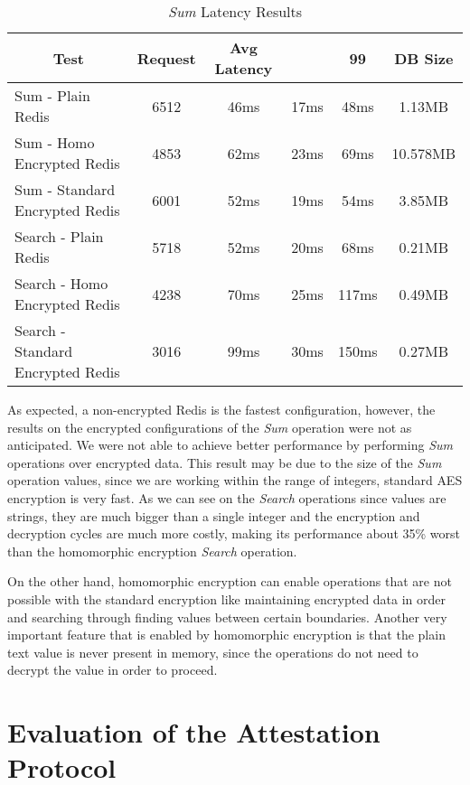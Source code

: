 \begin{table}[ht]
	\caption{\textit{Sum} Latency Results}
	\label{tab:sum_latency_results}
\centering
\hspace*{-5mm}
\begin{tabular}{lccccc}
	\toprule
	\multicolumn{1}{c}{\textbf{Test}} & \pmb{\#}\textbf{Request} & \textbf{Avg Latency} & \pmb{\ensuremath{\sigma}} & \textbf{99}\pmb{\%} & \textbf{DB Size} \\
	\midrule
		Sum - Plain Redis & 6512 & 46ms & 17ms & 48ms & 1.13MB  					\\
		Sum - Homo Encrypted Redis & 4853 & 62ms & 23ms & 69ms & 10.578MB  		\\
		Sum - Standard Encrypted Redis & 6001 & 52ms & 19ms & 54ms & 3.85MB  	\\
		Search - Plain Redis & 5718 & 52ms & 20ms & 68ms & 0.21MB				\\
		Search - Homo Encrypted Redis & 4238	 & 70ms & 25ms & 117ms & 0.49MB		\\
		Search - Standard Encrypted Redis & 3016	 & 99ms & 30ms & 150ms & 0.27MB	\\
	\bottomrule
\end{tabular}
\end{table}

As expected, a non-encrypted Redis is the fastest configuration, however, the results on the encrypted configurations of the \textit{Sum} operation were not as anticipated. We were not able to achieve better performance by performing \textit{Sum} operations over encrypted data. This result may be due to the size of the \textit{Sum} operation values, since we are working within the range of integers, standard \gls{AES} encryption is very fast. As we can see on the \textit{Search} operations since values are strings, they are much bigger than a single integer and the encryption and decryption cycles are much more costly, making its performance about 35\% worst than the homomorphic encryption \textit{Search} operation.

On the other hand, homomorphic encryption can enable operations that are not possible with the standard encryption like maintaining encrypted data in order and searching through finding values between certain boundaries. Another very important feature that is enabled by homomorphic encryption is that the plain text value is never present in memory, since the operations do not need to decrypt the value in order to proceed.

\section{Evaluation of the Attestation Protocol}
\label{sec:evaluation_attestation_protocol}

